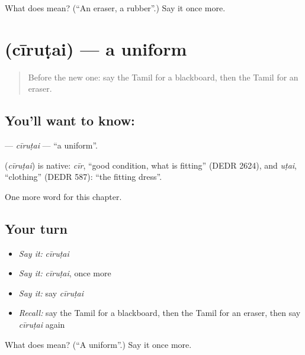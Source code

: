 \begin{tcolorbox}[breakable,colback=teal!4,colframe=teal!35!black,title={Before you move on}]
What does  mean? (\textquotedblleft{}An eraser, a rubber\textquotedblright{}.) Say it once more.
\end{tcolorbox}
\section[\texorpdfstring{\ta{சீருடை} (cīruṭai)}{சீருடை (cīruṭai)}]{ (cīruṭai) — a uniform}

\label{lesson:TA-C221-cirutai}



\begin{quote}
Before the new one: say the Tamil for a blackboard, then the Tamil for an eraser.
\end{quote}

\subsection*{You'll want to know: }
\textbf{} — \emph{cīruṭai} — \textquotedblleft{}a uniform\textquotedblright{}.

\begin{cousinweb}
\textbf{} (\emph{cīruṭai}) is native: \emph{cīr}, \textquotedblleft{}good condition, what is fitting\textquotedblright{} (DEDR 2624), and \emph{uṭai}, \textquotedblleft{}clothing\textquotedblright{} (DEDR 587): \textquotedblleft{}the fitting dress\textquotedblright{}.
\end{cousinweb}

\begin{grammarlens}[title={What you've built}]
One more word for this chapter.
\end{grammarlens}

\subsection*{Your turn}
\begin{itemize}
\raggedright
  \item \emph{Say it:} \emph{cīruṭai}
  \item \emph{Say it:} \emph{cīruṭai}, once more
  \item \emph{Say it:} say \emph{cīruṭai}
  \item \emph{Recall:} say the Tamil for a blackboard, then the Tamil for an eraser, then say \emph{cīruṭai} again
\end{itemize}

\begin{tcolorbox}[breakable,colback=teal!4,colframe=teal!35!black,title={Before you move on}]
What does  mean? (\textquotedblleft{}A uniform\textquotedblright{}.) Say it once more.
\end{tcolorbox}
